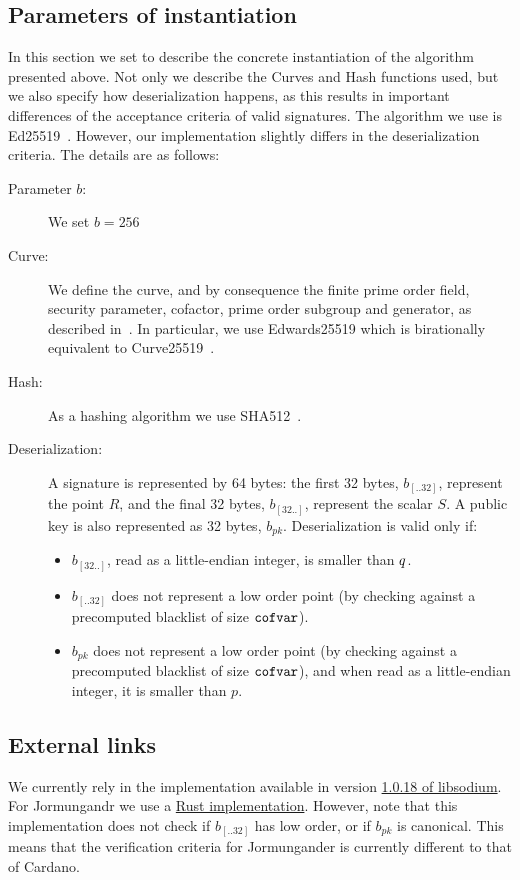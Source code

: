 \subsection{Parameters of instantiation}
\label{sec:parameters}
In this section we set to describe the concrete instantiation of the algorithm presented above. Not only we describe
the Curves and Hash functions used, but we also specify how deserialization happens, as this results in important
differences of the acceptance criteria of valid signatures. The algorithm we use is Ed25519~\cite{CHES:BDLSY11}.
However, our implementation slightly differs in the deserialization criteria. The details are as follows:
\begin{description}
    \item[Parameter $b$:] We set $b=256$
    \item[Curve:] We define the curve, and by consequence the finite prime order field, security parameter, cofactor,
    prime order subgroup and generator, as described in~\cite{CHES:BDLSY11}. In particular, we use Edwards25519 which
    is birationally equivalent to Curve25519~\cite{PKC:Bernstein06}.
    \item[Hash:] As a hashing algorithm we use SHA512~\cite{FIPS1802}.
    \item[Deserialization:] A signature is represented by 64 bytes: the first 32 bytes, $b_{[..32]}$, represent the
    point $R$, and the final 32 bytes, $b_{[32..]}$, represent the scalar $S$. A public key is also represented as 32
    bytes, $b_{pk}$. Deserialization is valid only if:
    \begin{itemize}
        \item $b_{[32..]}$, read as a little-endian integer, is smaller than $q$.
        \item $b_{[..32]}$ does not represent a low order point (by checking against a precomputed blacklist of size
        $\texttt{cofvar}$).
        \item $b_{pk}$ does not represent a low order point (by checking against a precomputed blacklist of size
        $\texttt{cofvar}$), and when read as a little-endian integer, it is smaller than $p$.
    \end{itemize}
\end{description}

\subsection{External links}
We currently rely in the implementation available in version \href{https://github.com/jedisct1/libsodium/tree/1.0
.18/src/libsodium/crypto_sign/ed25519/ref10}{1.0.18 of libsodium}. For Jormungandr we use a \href{https://docs
.rs/cryptoxide/latest/cryptoxide/ed25519/index.html}{Rust implementation}. However, note that this implementation
does not check if $b_{[..32]}$ has low order, or if $b_{pk}$ is canonical. This means that the verification criteria
for Jormungander is currently different to that of Cardano.
